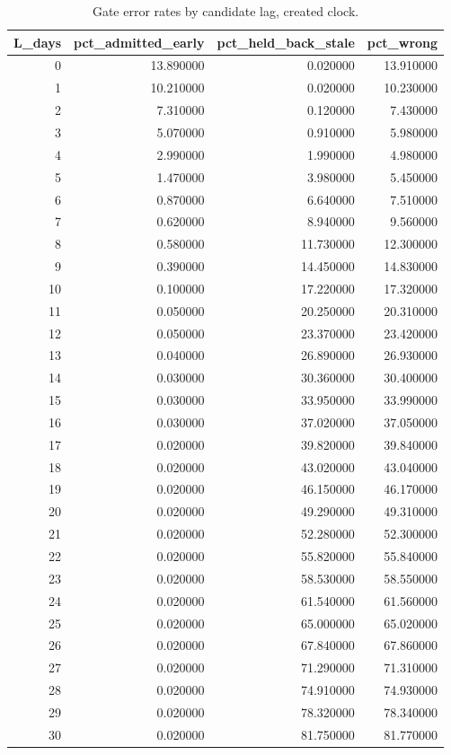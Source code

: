 \begin{table}
\caption{Gate error rates by candidate lag, created clock.}
\label{tab:nb16_lag_error_created}
\begin{tabular}{rrrr}
\toprule
L_days & pct_admitted_early & pct_held_back_stale & pct_wrong \\
\midrule
0 & 13.890000 & 0.020000 & 13.910000 \\
1 & 10.210000 & 0.020000 & 10.230000 \\
2 & 7.310000 & 0.120000 & 7.430000 \\
3 & 5.070000 & 0.910000 & 5.980000 \\
4 & 2.990000 & 1.990000 & 4.980000 \\
5 & 1.470000 & 3.980000 & 5.450000 \\
6 & 0.870000 & 6.640000 & 7.510000 \\
7 & 0.620000 & 8.940000 & 9.560000 \\
8 & 0.580000 & 11.730000 & 12.300000 \\
9 & 0.390000 & 14.450000 & 14.830000 \\
10 & 0.100000 & 17.220000 & 17.320000 \\
11 & 0.050000 & 20.250000 & 20.310000 \\
12 & 0.050000 & 23.370000 & 23.420000 \\
13 & 0.040000 & 26.890000 & 26.930000 \\
14 & 0.030000 & 30.360000 & 30.400000 \\
15 & 0.030000 & 33.950000 & 33.990000 \\
16 & 0.030000 & 37.020000 & 37.050000 \\
17 & 0.020000 & 39.820000 & 39.840000 \\
18 & 0.020000 & 43.020000 & 43.040000 \\
19 & 0.020000 & 46.150000 & 46.170000 \\
20 & 0.020000 & 49.290000 & 49.310000 \\
21 & 0.020000 & 52.280000 & 52.300000 \\
22 & 0.020000 & 55.820000 & 55.840000 \\
23 & 0.020000 & 58.530000 & 58.550000 \\
24 & 0.020000 & 61.540000 & 61.560000 \\
25 & 0.020000 & 65.000000 & 65.020000 \\
26 & 0.020000 & 67.840000 & 67.860000 \\
27 & 0.020000 & 71.290000 & 71.310000 \\
28 & 0.020000 & 74.910000 & 74.930000 \\
29 & 0.020000 & 78.320000 & 78.340000 \\
30 & 0.020000 & 81.750000 & 81.770000 \\
\bottomrule
\end{tabular}
\end{table}

